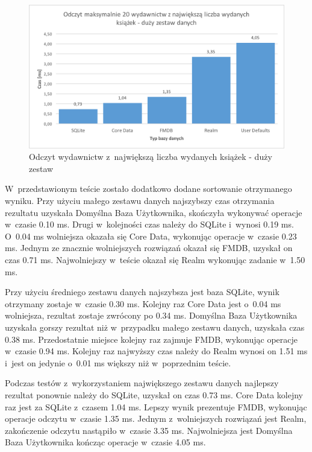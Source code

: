 \begin{figure}[H]
\centering
	\includegraphics[width=13.5cm]{img/read_data/read_by_publishers/read_by_publishers_big_test.png}
	\caption{Odczyt wydawnictw z~największą liczba wydanych książek - duży zestaw}
	\label{fig: read-by-publishers-big}
\end{figure}

 W~przedstawionym teście zostało dodatkowo dodane sortowanie otrzymanego wyniku. Przy użyciu małego zestawu danych najszybszy czas otrzymania rezultatu uzyskała Domyślna Baza Użytkownika, skończyła wykonywać operacje w~czasie 0.10 ms. Drugi w~kolejności czas należy do SQLite i~wynosi 0.19 ms. O~0.04 ms wolniejsza okazała się Core Data, wykonując operacje w~czasie 0.23 ms. Jednym ze znacznie wolniejszych rozwiązań okazał się FMDB, uzyskał on czas 0.71 ms. Najwolniejszy w~teście okazał się Realm wykonując zadanie w~1.50 ms.\par

Przy użyciu średniego zestawu danych najszybsza jest baza SQLite, wynik otrzymany zostaje w~czasie 0.30 ms. Kolejny raz Core Data jest o~0.04 ms wolniejsza, rezultat zostaje zwrócony po 0.34 ms. Domyślna Baza Użytkownika uzyskała gorszy rezultat niż w~przypadku małego zestawu danych, uzyskała czas 0.38 ms. Przedostatnie miejsce kolejny raz zajmuje FMDB, wykonując operacje w~czasie 0.94 ms. Kolejny raz najwyższy czas należy do Realm wynosi on 1.51 ms i~jest on jedynie o~0.01 ms większy niż w~poprzednim teście.\par

Podczas testów z~wykorzystaniem największego zestawu danych najlepszy rezultat ponownie należy do SQLite, uzyskał on czas 0.73 ms. Core Data kolejny raz jest za SQLite z~czasem 1.04 ms. Lepszy wynik prezentuje FMDB, wykonując operacje odczytu w~czasie 1.35 ms. Jednym z~wolniejszych rozwiązań jest Realm, zakończenie odczytu nastąpiło w~czasie 3.35 ms. Najwolniejsza jest Domyślna Baza Użytkownika kończąc operacje w~czasie 4.05 ms. 

